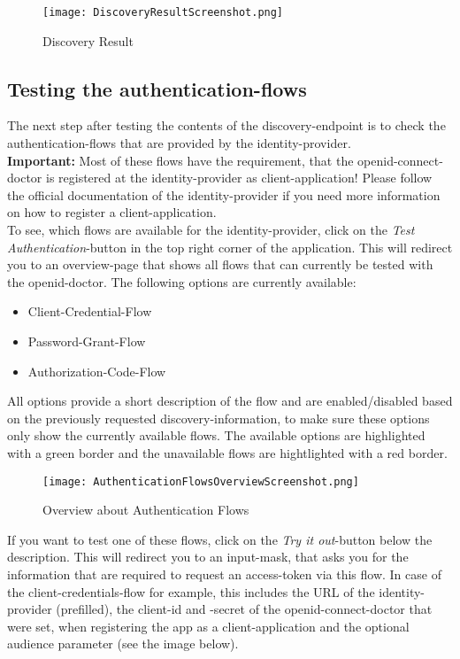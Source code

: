 \documentclass[english, letterpaper, 10 pt]{report}
\begin{document}
\begin{figure}[H]
\texttt{[image: DiscoveryResultScreenshot.png]}
\caption{Discovery Result}
\end{figure}

\subsection*{Testing the authentication-flows}

\noindent The next step after testing the contents of the discovery-endpoint is to check the authentication-flows that are provided by the identity-provider.
\\

\noindent \textbf{Important:} Most of these flows have the requirement, that the openid-connect-doctor is registered at the identity-provider as client-application! Please follow the official documentation of the identity-provider if you need more information on how to register a client-application.
\\

\noindent To see, which flows are available for the identity-provider, click on the \textit{Test Authentication}-button in the top right corner of the application. This will redirect you to an overview-page that shows all flows that can currently be tested with the openid-doctor. The following options are currently available:
\begin{itemize}
\item Client-Credential-Flow
\item Password-Grant-Flow
\item Authorization-Code-Flow
\end{itemize}

\noindent All options provide a short description of the flow and are enabled/disabled based on the previously requested discovery-information, to make sure these options only show the currently available flows. The available options are highlighted with a green border and the unavailable flows are hightlighted with a red border.
\\
\begin{figure}[H]
\texttt{[image: AuthenticationFlowsOverviewScreenshot.png]}
\caption{Overview about Authentication Flows}
\end{figure}


\noindent If you want to test one of these flows, click on the \textit{Try it out}-button below the description. This will redirect you to an input-mask, that asks you for the information that are required to request an access-token via this flow. In case of the client-credentials-flow for example, this includes the URL of the identity-provider (prefilled), the client-id and -secret of the openid-connect-doctor that were set, when registering the app as a client-application and the optional audience parameter (see the image below).
\newpage
\end{document}

